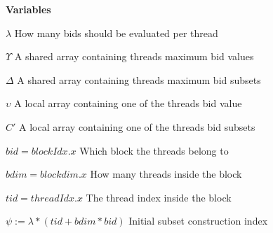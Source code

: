 \documentclass[a4paper, 12pt]{report}
\begin{document}
\textbf{Variables} 

$\lambda$ \hfill How many bids should be evaluated per thread

$\Upsilon$ \hfill A shared array containing threads maximum bid values

$\Delta$ \hfill A shared array containing threads maximum bid subsets

$\upsilon$ \hfill A local array containing one of the threads bid value

$C'$ \hfill A local array containing one of the threads bid subsets

$bid = blockIdx.x$ \hfill Which block the threads belong to

$bdim = blockdim.x$ \hfill How many threads inside the block

$tid = threadIdx.x$ \hfill The thread index inside the block

$\psi := \lambda*(tid+bdim*bid)$ \hfill Initial subset construction index
\end{document}
